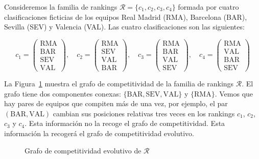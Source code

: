\begin{ejemplo} \label{ej:grafo_competitividad}
Consideremos la familia de rankings $\mathcal{R} =\{c_1, c_2, c_3, c_4\}$ formada por cuatro clasificaciones ficticias de los equipos Real Madrid (RMA), Barcelona (BAR), Sevilla (SEV) y Valencia (VAL). Las cuatro clasificaciones son las siguientes:

\begin{equation*}
c_1 = \left( \begin{array}{c}
\text{RMA}\\
\text{BAR}\\
\text{SEV}\\
\text{VAL}
\end{array} \right), \quad
c_2 = \left( \begin{array}{c}
\text{RMA}\\
\text{SEV}\\
\text{VAL}\\
\text{BAR}
\end{array} \right), \quad
c_3 = \left( \begin{array}{c}
\text{RMA}\\
\text{BAR}\\
\text{VAL}\\
\text{SEV}
\end{array} \right), \quad
c_4 = \left( \begin{array}{c}
\text{RMA}\\
\text{VAL}\\
\text{BAR}\\
\text{SEV}
\end{array} \right)
\end{equation*}

La Figura~\ref{fig:grafo_competitividad} muestra el grafo de competitividad de la familia de rankings $\mathcal{R}$. El grafo tiene dos componentes conexas: $\{\text{BAR}, \text{SEV}, \text{VAL}\}$ y $\{\text{RMA}\}$. Vemos que hay pares de equipos que compiten más de una vez, por ejemplo, el par $(\text{BAR}, \text{VAL})$ cambian sus posiciones relativas tres veces en los rankings $c_1$, $c_2$, $c_3$ y $c_4$. Esta información no la recoge el grafo de competitividad. Esta información la recogerá el grafo de competitividad evolutivo. 

\begin{figure}[htb]
\centering
\ejemplografocompetitividad
\caption[Grafo de competitividad]{Grafo de competitividad evolutivo de $\mathcal{R}$}
\label{fig:grafo_competitividad}
\end{figure}

\end{ejemplo}


